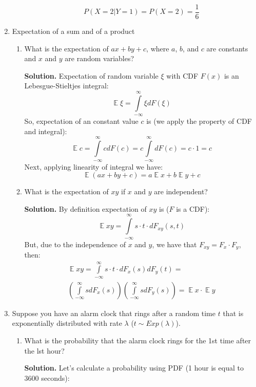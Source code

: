 \documentclass[a4paper, 12pt]{article}
\DeclareMathOperator{\E}{\mathbb{E}}
\newcommand{\rbra}[1]{\left( #1 \right)}
\newcommand{\task}[2]{
    \item #1
    \begin{mdframed} \textbf{Solution. } #2 \end{mdframed}
}
\begin{document}
\begin{enumerate}
\begin{enumerate}
{                  \[
                      P(X=2 | Y=1) = P(X=2) = \frac{1}{6}
                  \]
              }
          \end{enumerate}
    \item Expectation of a sum and of a product
          \begin{enumerate}
              \task{What is the expectation of $ax + by+c$, where $a$, $b$, and $c$ are constants and $x$ and $y$ are
                  random variables?}
              {Expectation of random variable $\xi$ with CDF $F(x)$ is an
                  Lebesgue-Stieltjes integral:
                  \[
                      \E \xi = \int\limits_{-\infty}^{\infty} \xi dF(\xi)
                  \]
                  So, expectation of an constant value $c$ is (we apply the property of CDF and integral):
                  \[
                      \E c = \int\limits_{-\infty}^{\infty} c dF(c) = c \int\limits_{-\infty}^{\infty} dF(c) = c \cdot 1 = c
                  \]
                  Next, applying linearity of integral we have:
                  \[
                      \E \rbra{ax + by + c} = a \E x + b \E y + c
                  \]
              }
              \task{What is the expectation of $xy$ if $x$ and $y$ are independent?}
              {
                  By definition expectation of $xy$ is ($F$ is a CDF):
                  \[
                      \E xy = \int\limits_{-\infty}^{\infty} s \cdot t \cdot dF_{xy}(s, t)
                  \]
                  But, due to the independence of $x$ and $y$, we have that
                  $F_{xy} = F_x \cdot F_y$, then:
                  \begin{multline*}
                      \E xy = \int\limits_{-\infty}^{\infty} s \cdot t \cdot dF_x(s) dF_y(t) = \\
                      \rbra{\int\limits_{-\infty}^{\infty} s dF_x(s)}
                      \rbra{\int\limits_{-\infty}^{\infty} s dF_y(s)} = \E x \cdot \E y
                  \end{multline*}
              }
          \end{enumerate}
    \item Suppose you have an alarm clock that rings after a random time $t$ that is exponentially
          distributed with rate $\lambda$ ($t \sim Exp(\lambda)$).
          \begin{enumerate}
              \task{What is the probability that the alarm clock rings for the 1st time after the lst hour?
              }
              {
              Let's calculate a probability using PDF (1 hour is equal to 3600 seconds):
}
\end{enumerate}
\end{enumerate}
\end{document}

